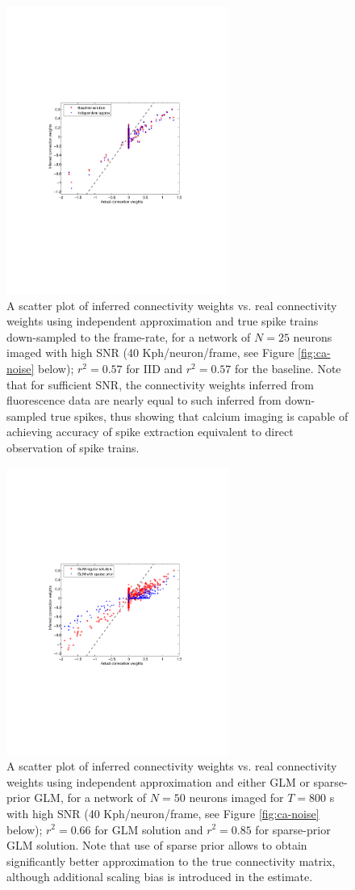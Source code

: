 \documentclass[amsmath,amssymb]{revtex4}
\begin{document}
\begin{figure}
\includegraphics[width=275px]{Figure2_fluor_base_vs_iid}
\caption{A scatter plot of inferred connectivity weights vs. real connectivity weights
using independent approximation and true spike trains down-sampled to the frame-rate,
for a network of $N=25$ neurons imaged
with high SNR (40 Kph/neuron/frame, see Figure \ref{fig:ca-noise} below); $r^2=0.57$ for IID and $r^2=0.57$ for the baseline. Note that for sufficient SNR, the connectivity weights inferred from fluorescence data are nearly equal to such inferred from down-sampled true spikes, thus showing that calcium imaging is capable of achieving accuracy of spike extraction equivalent to direct observation of spike trains.}
\label{fig:iid-base}
\end{figure}
\begin{figure}
\includegraphics[width=275px]{Figure9_fluor_sparse_sol}
\caption{A scatter plot of inferred connectivity weights vs. real connectivity weights
using independent approximation and either GLM or sparse-prior GLM,
for a network of $N=50$ neurons imaged for $T=800$ s
with high SNR (40 Kph/neuron/frame, see Figure \ref{fig:ca-noise} below); $r^2=0.66$ for GLM solution and $r^2=0.85$ for sparse-prior GLM solution. Note that use of sparse prior allows to obtain significantly better approximation to the true connectivity matrix, although additional scaling bias is introduced in the estimate.}
\label{fig:sparse-sol}
\end{figure}
\end{document}
